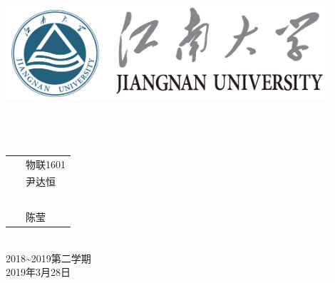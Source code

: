 \documentclass[a4paper]{ctexart}
\begin{document}
\begin{titlepage}
	\begin{center}
		\includegraphics[width=0.9\textwidth]{figure//Njust.png}\\
		\vspace{10mm}
		\textbf{}\\[0.8cm]
		\textbf{}\\[3cm]
		\textbf{}\\[3cm]
		\vspace{\fill}
		\setlength{\extrarowheight}{3mm}
		{\songti{}
			\begin{tabular}{rl}
				{\makebox[4\ccwd][s]{班\qquad 级：}} & ~\kaishu 物联1601   \\
				{\makebox[4\ccwd][s]{姓\qquad 名：}} & ~\kaishu 尹达恒     \\
				{\makebox[4\ccwd][s]{学\qquad 号：}} & ~\kaishu 1030616134 \\
				{\makebox[4\ccwd][s]{指导老师：}}    & ~\kaishu 陈莹       \\
			\end{tabular}
		}\\[2cm]
		\vspace{\fill}
		2018\textasciitilde 2019第二学期\\
		2019年3月28日
	\end{center}
\end{titlepage}
\end{document}
